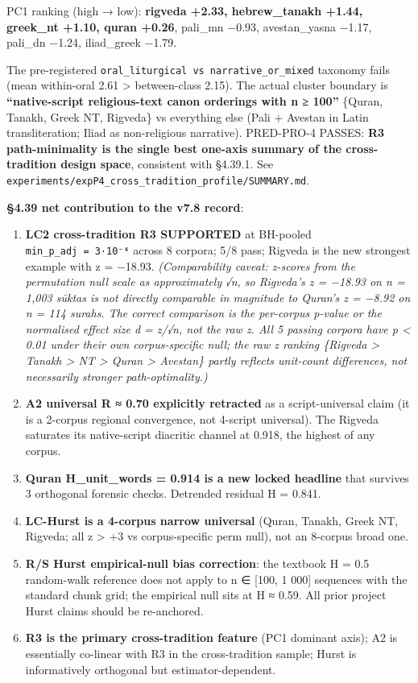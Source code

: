 \documentclass[
]{article}
\providecommand{\tightlist}{%
  \setlength{\itemsep}{0pt}\setlength{\parskip}{0pt}}
\begin{document}
PC1 ranking (high → low): \textbf{rigveda +2.33, hebrew\_tanakh +1.44,
greek\_nt +1.10, quran +0.26}, pali\_mn −0.93, avestan\_yasna −1.17,
pali\_dn −1.24, iliad\_greek −1.79.

The pre-registered \texttt{oral\_liturgical\ vs\ narrative\_or\_mixed}
taxonomy fails (mean within-oral 2.61 \textgreater{} between-class
2.15). The actual cluster boundary is \textbf{``native-script
religious-text canon orderings with n ≥ 100''} \{Quran, Tanakh, Greek
NT, Rigveda\} vs everything else (Pali + Avestan in Latin
transliteration; Iliad as non-religious narrative). PRED-PRO-4 PASSES:
\textbf{R3 path-minimality is the single best one-axis summary of the
cross-tradition design space}, consistent with §4.39.1. See
\texttt{experiments/expP4\_cross\_tradition\_profile/SUMMARY.md}.

\textbf{§4.39 net contribution to the v7.8 record}:

\begin{enumerate}
\def\labelenumi{\arabic{enumi}.}
\tightlist
\item
  \textbf{LC2 cross-tradition R3 SUPPORTED} at BH-pooled
  \texttt{min\_p\_adj\ =\ 3·10⁻⁴} across 8 corpora; 5/8 pass; Rigveda is
  the new strongest example with z = −18.93. \emph{(Comparability
  caveat: z-scores from the permutation null scale as approximately √n,
  so Rigveda's z = −18.93 on n = 1,003 sūktas is not directly comparable
  in magnitude to Quran's z = −8.92 on n = 114 surahs. The correct
  comparison is the per-corpus p-value or the normalised effect size d =
  z/√n, not the raw z. All 5 passing corpora have p \textless{} 0.01
  under their own corpus-specific null; the raw z ranking \{Rigveda
  \textgreater{} Tanakh \textgreater{} NT \textgreater{} Quran
  \textgreater{} Avestan\} partly reflects unit-count differences, not
  necessarily stronger path-optimality.)}
\item
  \textbf{A2 universal R ≈ 0.70 explicitly retracted} as a
  script-universal claim (it is a 2-corpus regional convergence, not
  4-script universal). The Rigveda saturates its native-script diacritic
  channel at 0.918, the highest of any corpus.
\item
  \textbf{Quran H\_unit\_words = 0.914 is a new locked headline} that
  survives 3 orthogonal forensic checks. Detrended residual H = 0.841.
\item
  \textbf{LC-Hurst is a 4-corpus narrow universal} (Quran, Tanakh, Greek
  NT, Rigveda; all z \textgreater{} +3 vs corpus-specific perm null),
  not an 8-corpus broad one.
\item
  \textbf{R/S Hurst empirical-null bias correction}: the textbook H =
  0.5 random-walk reference does not apply to n ∈ {[}100, 1 000{]}
  sequences with the standard chunk grid; the empirical null sits at H ≈
  0.59. All prior project Hurst claims should be re-anchored.
\item
  \textbf{R3 is the primary cross-tradition feature} (PC1 dominant
  axis); A2 is essentially co-linear with R3 in the cross-tradition
  sample; Hurst is informatively orthogonal but estimator-dependent.
\end{enumerate}
\end{document}
